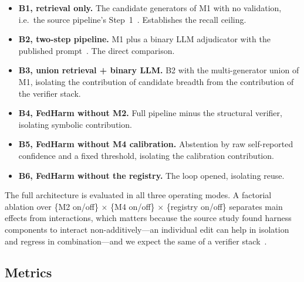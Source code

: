\documentclass[conference]{IEEEtran}
\begin{document}
\begin{itemize}
\item \textbf{B1, retrieval only.} The candidate generators of M1 with no validation, i.e.\ the source pipeline's Step~1~\cite{b1}. Establishes the recall ceiling.
\item \textbf{B2, two-step pipeline.} M1 plus a binary LLM adjudicator with the published prompt~\cite{b1}. The direct comparison.
\item \textbf{B3, union retrieval + binary LLM.} B2 with the multi-generator union of M1, isolating the contribution of candidate breadth from the contribution of the verifier stack.
\item \textbf{B4, FedHarm without M2.} Full pipeline minus the structural verifier, isolating symbolic contribution.
\item \textbf{B5, FedHarm without M4 calibration.} Abstention by raw self-reported confidence and a fixed threshold, isolating the calibration contribution.
\item \textbf{B6, FedHarm without the registry.} The loop opened, isolating reuse.
\end{itemize}
The full architecture is evaluated in all three operating modes. A factorial ablation over \{M2 on/off\} $\times$ \{M4 on/off\} $\times$ \{registry on/off\} separates main effects from interactions, which matters because the source study found harness components to interact non-additively---an individual edit can help in isolation and regress in combination---and we expect the same of a verifier stack~\cite{b1}.

\subsection{Metrics}
\end{document}
